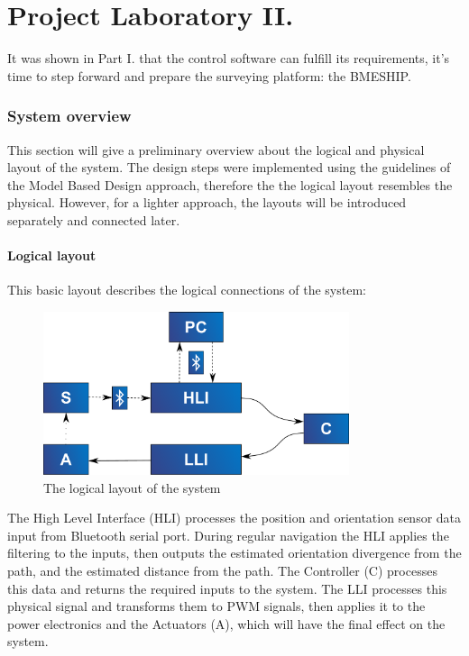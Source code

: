 \part{Project Laboratory II.}
\setcounter{section}{0}

It was shown in Part I. that the control software can fulfill its requirements, it's time to step forward and prepare the surveying platform: the BMESHIP.

\section{System overview}

This section will give a preliminary overview about the logical and physical layout of the system. The design steps were implemented using the guidelines of the Model Based Design approach, therefore the the logical layout resembles the physical. However, for a lighter approach, the layouts will be introduced separately and connected later.

\subsection{Logical layout}

This basic layout describes the logical connections of the system:

\begin{figure}[H]
	\centering
	\includegraphics[width=0.8\textwidth]{img2/LogicalLayout}
	\caption{The logical layout of the system}
	\label{fig:LogicalLayout}
\end{figure}

The High Level Interface (HLI) processes the position and orientation sensor data input from Bluetooth serial port. During regular navigation the HLI applies the filtering to the inputs, then outputs the estimated orientation divergence from the path, and the estimated distance from the path. The Controller (C) processes this data and returns the required inputs to the system. The LLI processes this physical signal and transforms them to PWM signals, then applies it to the power electronics and the Actuators (A), which will have the final effect on the system.


